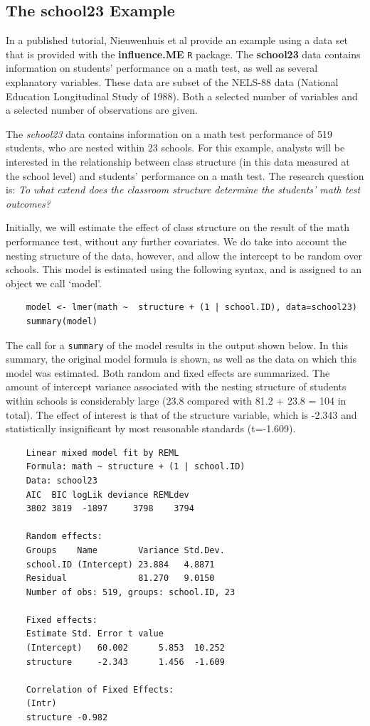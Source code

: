 \documentclass[12pt, a4paper]{report}
\begin{document}
\subsection{ The school23 Example }
In a published tutorial, Nieuwenhuis et al provide an example using a data set that is provided with the \textbf{influence.ME} \texttt{R} package. The \textbf{school23} data contains information on students’ performance on a math test, as well as several
explanatory variables. These data are subset of the NELS-88 data (National Education Longitudinal
Study of 1988). Both a selected number of variables and a selected number of observations are given.


The \textit{school23} data contains information on a math test performance of 519 students, who are nested within 23 schools. For this example,  analysts will be interested in the relationship between class structure (in this data measured at the school level) and students’ performance on a math test. The research question is: \textit{To what extend does the classroom structure determine the students’ math test outcomes?}

Initially, we will estimate the effect of class structure on the result of the math performance test, without any further covariates. We do take into account the nesting structure of the data, however, and allow the intercept to be random over schools. This model is estimated using the following syntax, and is assigned to an object we call ‘model’.
\begin{framed}
	\begin{verbatim}
	model <- lmer(math ~  structure + (1 | school.ID), data=school23)
	summary(model)
	\end{verbatim}
\end{framed}
The call for a \texttt{summary} of the model results in the output shown below. In this summary, the original model formula is shown, as well as the data on which this model was estimated. Both random and fixed effects are summarized. The amount of intercept variance associated with the nesting structure of students within schools is considerably large (23.8 compared with 81.2 + 23.8 = 104 in total). The effect of interest is that of the structure variable, which is -2.343 and statistically insignificant by most reasonable standards (t=-1.609).

\begin{framed}
	\begin{verbatim}
	Linear mixed model fit by REML 
	Formula: math ~ structure + (1 | school.ID) 
	Data: school23 
	AIC  BIC logLik deviance REMLdev
	3802 3819  -1897     3798    3794
	
	Random effects:
	Groups    Name        Variance Std.Dev.
	school.ID (Intercept) 23.884   4.8871  
	Residual              81.270   9.0150  
	Number of obs: 519, groups: school.ID, 23
	
	Fixed effects:
	Estimate Std. Error t value
	(Intercept)   60.002      5.853  10.252
	structure     -2.343      1.456  -1.609
	
	Correlation of Fixed Effects:
	(Intr)
	structure -0.982
	\end{verbatim}
\end{framed}
\end{document}
